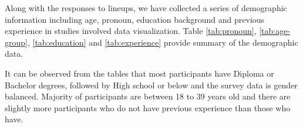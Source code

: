 \documentclass[]{interact}
\theoremstyle{plain}%
\theoremstyle{definition}
\theoremstyle{remark}
\begin{document}
Along with the responses to lineups, we have collected a series of
demographic information including age, pronoun, education background and
previous experience in studies involved data visualization. Table
\ref{tab:pronoun}, \ref{tab:age-group}, \ref{tab:education} and
\ref{tab:experience} provide summary of the demographic data.

It can be observed from the tables that most participants have Diploma
or Bachelor degrees, followed by High school or below and the survey
data is gender balanced. Majority of participants are between 18 to 39
years old and there are slightly more participants who do not have
previous experience than those who have.

\begin{table}

\caption{\label{tab:pronoun}Summary of pronoun distribution of participants recruited in this study.}
\centering
{}
\end{table}

\begin{table}

\caption{\label{tab:age-group}Summary of age distribution of participants recruited in this study.}
\centering
{}
\end{table}
\end{document}
